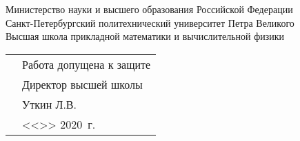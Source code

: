\thispagestyle{empty}%
\makeatletter
{}
%
\makeatother



{\centering%
	Министерство науки и высшего образования Российской Федерации\\
	Санкт-Петербургский политехнический университет Петра Великого\\
	{%
	Высшая школа прикладной математики и вычислительной физики}
\par}%


\vspace{0pt plus1fill} %


\noindent
\begin{minipage}{\linewidth}
	\vspace{\mfloatsep} %
	\begin{tabularx}{\linewidth}{Xl}
	&Работа допущена к защите     \\
	&Директор высшей школы     \\			
	&\underline{\hspace*{0.1\textheight}} Уткин Л.В.    \\
	&<<\underline{\hspace*{0.05\textheight}}>> \underline{\hspace*{0.1\textheight}} 2020~г.  \\ 
	\end{tabularx}
	\vspace{\mfloatsep} %
\end{minipage}


\vspace{0pt plus2fill} %


